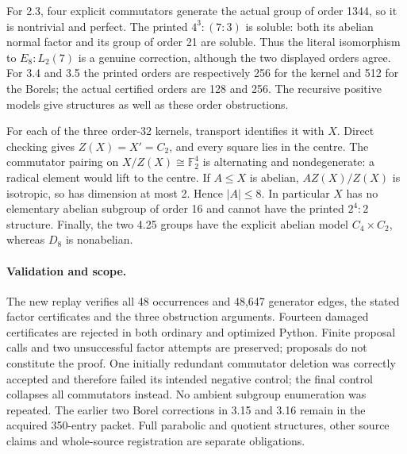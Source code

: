 \documentclass[11pt]{article}
\begin{document}
For 2.3, four explicit commutators generate the actual group of order
1344, so it is nontrivial and perfect. The printed $4^3:(7:3)$ is soluble:
both its abelian normal factor and its group of order 21 are soluble.
Thus the literal isomorphism to $E_8:L_2(7)$ is a genuine correction,
although the two displayed orders agree. For 3.4 and 3.5 the printed
orders are respectively 256 for the kernel and 512 for the Borels;
the actual certified orders are 128 and 256. The recursive positive
models give structures as well as these order obstructions.

For each of the three order-32 kernels, transport identifies it with
$X$. Direct checking gives $Z(X)=X'=C_2$, and every square lies in the
centre. The commutator pairing on $X/Z(X)\cong\mathbb F_2^4$ is
alternating and nondegenerate: a radical element would lift to the
centre. If $A\le X$ is abelian, $AZ(X)/Z(X)$ is isotropic, so has
dimension at most 2. Hence $|A|\le 8$. In particular $X$ has no
elementary abelian subgroup of order 16 and cannot have the printed
$2^4:2$ structure. Finally, the two 4.25 groups have the explicit
abelian model $C_4\times C_2$, whereas $D_8$ is nonabelian.

\paragraph{Validation and scope.}
The new replay verifies all 48 occurrences and 48,647 generator edges,
the stated factor certificates and the three obstruction arguments.
Fourteen damaged certificates are rejected in both ordinary and
optimized Python. Finite proposal calls and two unsuccessful factor
attempts are preserved; proposals do not constitute the proof.
One initially redundant commutator deletion was correctly accepted and
therefore failed its intended negative control; the final control
collapses all commutators instead. No ambient subgroup enumeration was
repeated. The earlier two Borel corrections in 3.15 and 3.16 remain in
the acquired 350-entry packet. Full parabolic and quotient structures,
other source claims and whole-source registration are separate obligations.
\end{document}

